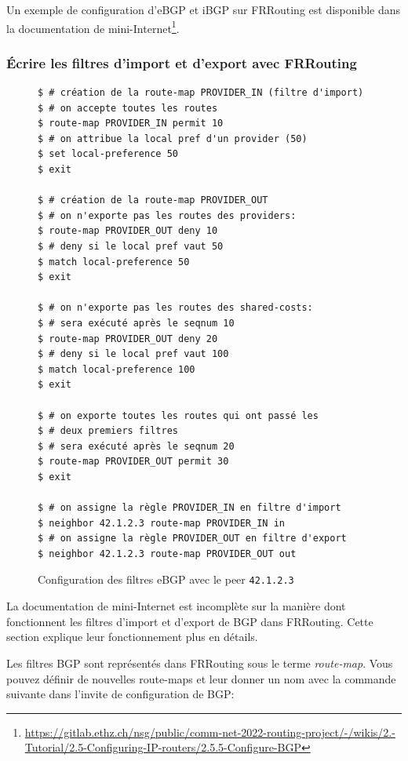 \documentclass[a4paper, 11pt]{article}
\begin{document}
Un exemple de configuration d'eBGP et iBGP sur FRRouting
est disponible dans la documentation de
mini-Internet\footnote{\url{https://gitlab.ethz.ch/nsg/public/comm-net-2022-routing-project/-/wikis/2.-Tutorial/2.5-Configuring-IP-routers/2.5.5-Configure-BGP}}.


\subsubsection{Écrire les filtres d'import et d'export avec FRRouting}

\begin{figure}
    \begin{verbatim}
$ # création de la route-map PROVIDER_IN (filtre d'import)
$ # on accepte toutes les routes
$ route-map PROVIDER_IN permit 10
$ # on attribue la local pref d'un provider (50)
$ set local-preference 50
$ exit

$ # création de la route-map PROVIDER_OUT
$ # on n'exporte pas les routes des providers:
$ route-map PROVIDER_OUT deny 10
$ # deny si le local pref vaut 50
$ match local-preference 50
$ exit

$ # on n'exporte pas les routes des shared-costs:
$ # sera exécuté après le seqnum 10
$ route-map PROVIDER_OUT deny 20
$ # deny si le local pref vaut 100
$ match local-preference 100
$ exit

$ # on exporte toutes les routes qui ont passé les
$ # deux premiers filtres
$ # sera exécuté après le seqnum 20
$ route-map PROVIDER_OUT permit 30
$ exit

$ # on assigne la règle PROVIDER_IN en filtre d'import
$ neighbor 42.1.2.3 route-map PROVIDER_IN in
$ # on assigne la règle PROVIDER_OUT en filtre d'export
$ neighbor 42.1.2.3 route-map PROVIDER_OUT out
    \end{verbatim}
    \caption{Configuration des filtres eBGP avec le peer \texttt{42.1.2.3}}
    \label{fig:bgp-filters}
    \end{figure}
La documentation de mini-Internet est incomplète sur la manière dont fonctionnent
les filtres d'import et d'export de BGP dans FRRouting. Cette section
explique leur fonctionnement plus en détails.

Les filtres BGP sont représentés dans FRRouting sous le terme
\textit{route-map}. Vous pouvez définir de nouvelles route-maps
et leur donner un nom avec la commande suivante dans l'invite de
configuration de BGP:
\end{document}
